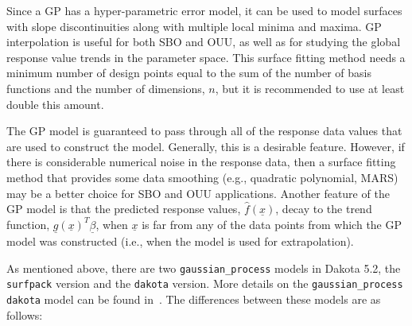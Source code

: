 Since a GP has a hyper-parametric error model, it can be used 
to model surfaces with slope discontinuities along with multiple 
local minima and maxima. GP interpolation is useful for both 
SBO and OUU, as well as for studying the global response value trends 
in the parameter space. This surface fitting method needs a 
minimum number of design points equal to the sum of the number of 
basis functions and the number of dimensions, $n$, but it is 
recommended to use at least double this amount.

The GP model is guaranteed to pass through all of the response 
data values that are used to construct the model. Generally, this is a
desirable feature. However, if there is considerable numerical noise
in the response data, then a surface fitting method that provides some
data smoothing (e.g., quadratic polynomial, MARS) may be a better
choice for SBO and OUU applications. Another feature of the GP
model is that the predicted response values, $\hat{f}(\underline{x})$,
decay to the trend function, 
$\underline{g}(\underline{x})^T\underline{\beta}$, when $\underline{x}$ 
is far from any of the data points from which the GP model was 
constructed (i.e., when the model is used for extrapolation). 

As mentioned above, there are two \texttt{gaussian\_process} models 
in Dakota 5.2, the \texttt{surfpack} version and the \texttt{dakota}
version.  More details on the \texttt{gaussian\_process dakota}
model can be found in~\cite{McF08}. The differences between these 
models are as follows: 

